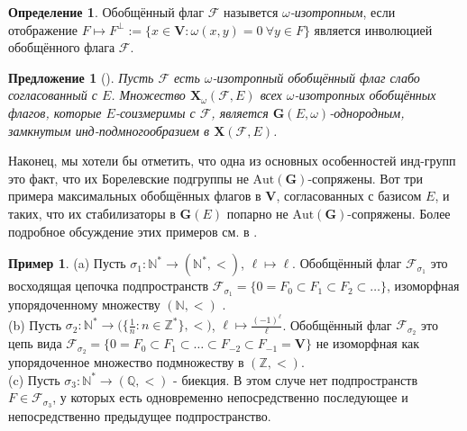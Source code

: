 \documentclass{amsart}
\newtheorem{proposition}{Предложение}
\theoremstyle{definition}
\newtheorem{definition}{Определение}
\newtheorem{notation}{Обозначение}
\newtheorem{example}{Пример}
\newcommand{\NN}{\mathbb{N}^*}
\begin{document}
%

\begin{definition}
Обобщённый флаг $\mathcal{F}$ назывется {\em $\omega$-изотропным}, если отображение $F\mapsto F^\perp:=\{x\in\mathbf{V}:\omega(x,y)=0\ \forall y\in F\}$
является инволюцией обобщённого флага  $\mathcal{F}$.
\end{definition}

\begin{proposition}[\cite{Dimitrov-Penkov}]
\label{P2.3-3}
Пусть $\mathcal{F}$ есть  $\omega$-изотропный обобщённый флаг слабо согласованный с $E$.
Множество $\mathbf{X}_\omega(\mathcal{F},E)$ всех
$\omega$-изотропных обобщённых флагов, которые $E$-соизмеримы с $\mathcal{F}$,
является $\mathbf{G}(E,\omega)$-однородным, замкнутым инд-подмногообразием в $\mathbf{X}(\mathcal{F},E)$.
\end{proposition}

Наконец, мы хотели бы отметить, что одна из основных особенностей  инд-групп это факт, что их Борелевские подгруппы не $\mathrm{Aut}(\mathbf{G})$-сопряжены.  Вот три примера максимальных обобщённых флагов в $\mathbf{V}$, согласованных с базисом $E$, и таких, что их стабилизаторы в $\mathbf{G}(E)$ попарно не $\mathrm{Aut}(\mathbf{G})$-сопряжены. Более подробное обсуждение этих примеров см. в \cite{Dimitrov-Penkov}.

\begin{example}
{\rm (a)} Пусть  $\sigma_1:\mathbb{N}^*\to(\mathbb{N}^*,<)$, $\ell\mapsto\ell$.
Обобщённый флаг $\mathcal{F}_{\sigma_1}$ это восходящая цепочка подпространств
$\mathcal{F}_{\sigma_1}=\{0=F_0\subset F_1\subset F_2\subset\ldots\}$, изоморфная упорядоченному множеству $(\mathbb{N},<)$ .
\\
{\rm (b)} Пусть $\sigma_2:\mathbb{N}^*\to\Big(\{\frac{1}{n}:n\in\mathbb{Z}^*\},<\Big)$, $\ell\mapsto \frac{(-1)^\ell}{\ell}$.
Обобщённый флаг $\mathcal{F}_{\sigma_2}$ это цепь вида
$\mathcal{F}_{\sigma_2}=\{0=F_0\subset F_1\subset\ldots\subset F_{-2}\subset F_{-1}=\mathbf{V}\}$
не изоморфная как упорядоченное множество подмножеству в $(\mathbb{Z},<)$.
\\
{\rm (c)} Пусть $\sigma_3:\mathbb{N}^*\to(\mathbb{Q},<)$ - биекция.
В этом случе нет подпространств $F\in\mathcal{F}_{\sigma_3}$, у которых есть одновременно  непосредственно последующее и непосредственно предыдущее подпространство.

\end{example}
\end{document}
